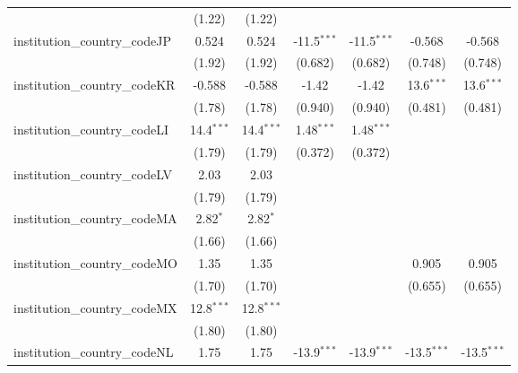 \begin{tabular}{lcccccc}
                                         & (1.22)        & (1.22)        &               &               &               &   \\   
   institution\_country\_codeJP          & 0.524         & 0.524         & -11.5$^{***}$ & -11.5$^{***}$ & -0.568        & -0.568\\   
                                         & (1.92)        & (1.92)        & (0.682)       & (0.682)       & (0.748)       & (0.748)\\   
   institution\_country\_codeKR          & -0.588        & -0.588        & -1.42         & -1.42         & 13.6$^{***}$  & 13.6$^{***}$\\   
                                         & (1.78)        & (1.78)        & (0.940)       & (0.940)       & (0.481)       & (0.481)\\   
   institution\_country\_codeLI          & 14.4$^{***}$  & 14.4$^{***}$  & 1.48$^{***}$  & 1.48$^{***}$  &               &   \\   
                                         & (1.79)        & (1.79)        & (0.372)       & (0.372)       &               &   \\   
   institution\_country\_codeLV          & 2.03          & 2.03          &               &               &               &   \\   
                                         & (1.79)        & (1.79)        &               &               &               &   \\   
   institution\_country\_codeMA          & 2.82$^{*}$    & 2.82$^{*}$    &               &               &               &   \\   
                                         & (1.66)        & (1.66)        &               &               &               &   \\   
   institution\_country\_codeMO          & 1.35          & 1.35          &               &               & 0.905         & 0.905\\   
                                         & (1.70)        & (1.70)        &               &               & (0.655)       & (0.655)\\   
   institution\_country\_codeMX          & 12.8$^{***}$  & 12.8$^{***}$  &               &               &               &   \\   
                                         & (1.80)        & (1.80)        &               &               &               &   \\   
   institution\_country\_codeNL          & 1.75          & 1.75          & -13.9$^{***}$ & -13.9$^{***}$ & -13.5$^{***}$ & -13.5$^{***}$\\   

\end{tabular}
